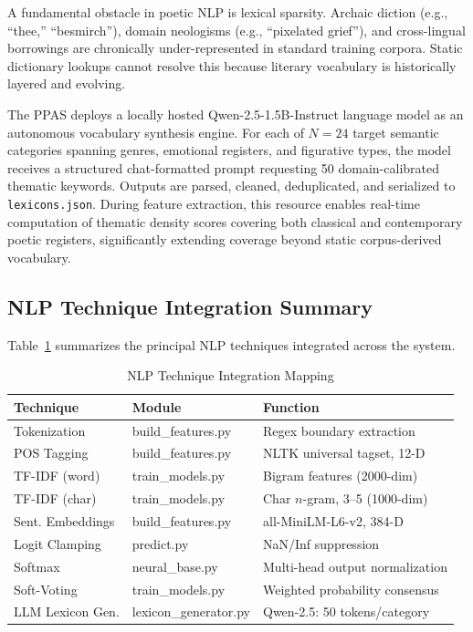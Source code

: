 \documentclass[conference]{IEEEtran}
\begin{document}
A fundamental obstacle in poetic NLP is lexical sparsity. Archaic diction
(e.g., ``thee,'' ``besmirch''), domain neologisms (e.g., ``pixelated
grief''), and cross-lingual borrowings are chronically under-represented
in standard training corpora. Static dictionary lookups cannot resolve
this because literary vocabulary is historically layered and evolving.

The PPAS deploys a locally hosted Qwen-2.5-1.5B-Instruct language model as
an autonomous vocabulary synthesis engine. For each of $N = 24$ target
semantic categories spanning genres, emotional registers, and figurative
types, the model receives a structured chat-formatted prompt requesting 50
domain-calibrated thematic keywords. Outputs are parsed, cleaned,
deduplicated, and serialized to \texttt{lexicons.json}. During feature
extraction, this resource enables real-time computation of thematic
density scores covering both classical and contemporary poetic registers,
significantly extending coverage beyond static corpus-derived vocabulary.

\subsection{NLP Technique Integration Summary}

Table~\ref{tab:nlp} summarizes the principal NLP techniques integrated
across the system.

\begin{table}[htbp]
\caption{NLP Technique Integration Mapping}
\label{tab:nlp}
\centering
\begin{tabular}{@{}lll@{}}
\toprule
\textbf{Technique} & \textbf{Module} & \textbf{Function} \\
\midrule
Tokenization      & build\_features.py      & Regex boundary extraction \\
POS Tagging       & build\_features.py      & NLTK universal tagset, 12-D \\
TF-IDF (word)     & train\_models.py        & Bigram features (2000-dim) \\
TF-IDF (char)     & train\_models.py        & Char $n$-gram, 3--5 (1000-dim) \\
Sent. Embeddings  & build\_features.py      & all-MiniLM-L6-v2, 384-D \\
Logit Clamping    & predict.py              & NaN/Inf suppression \\
Softmax           & neural\_base.py         & Multi-head output normalization \\
Soft-Voting       & train\_models.py        & Weighted probability consensus \\
LLM Lexicon Gen.  & lexicon\_generator.py   & Qwen-2.5: 50 tokens/category \\
\bottomrule
\end{tabular}
\end{table}
\end{document}
